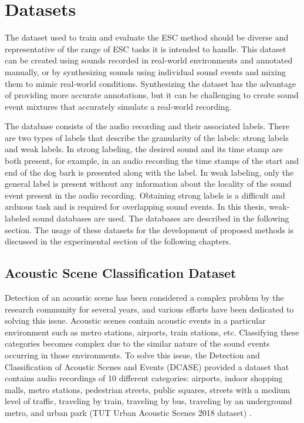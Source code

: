 \section{Datasets} %
\label{chapter:backroundDatasets}
The dataset used to train and evaluate the ESC method should be diverse and representative of the range of ESC tasks it is intended to handle. This dataset can be created using sounds recorded in real-world environments and annotated manually, or by synthesizing sounds using individual sound events and mixing them to mimic real-world conditions. Synthesizing the dataset has the advantage of providing more accurate annotations, but it can be challenging to create sound event mixtures that accurately simulate a real-world recording.

The database consists of the audio recording and their associated labels. There are two types of labels that describe the granularity of the labels: strong labels and weak labels. In strong labeling, the desired sound and its time stamp are both present, for example, in an audio recording the time stamps of the start and end of the dog bark is presented along with the label. In weak labeling, only the general label is present without any information about the locality of the sound event present in the audio recording. Obtaining strong labels is a difficult and arduous task and is required for overlapping sound events. In this thesis, weak-labeled sound databases are used. The databases are described in the following section. The usage of these datasets for the development of proposed methods is discussed in the experimental section of the following chapters.


\subsection{Acoustic Scene Classification Dataset} %
Detection of an acoustic scene has been considered a complex problem by the research community for several years, and various efforts have been dedicated to solving this issue. Acoustic scenes contain acoustic events in a particular environment such as metro stations, airports, train stations, etc.  Classifying these categories becomes complex due to the similar nature of the sound events occurring in those environments. To solve this issue, the Detection and Classification of
Acoustic Scenes and Events (DCASE) provided a dataset that contains audio recordings of 10 different categories: airports, indoor shopping malls, metro stations, pedestrian streets, public squares, streets with a medium level of traffic, traveling by train, traveling by bus, traveling by an underground metro, and urban park (TUT Urban Acoustic Scenes 2018 dataset) \cite{Mesaros2018_DCASE}.

